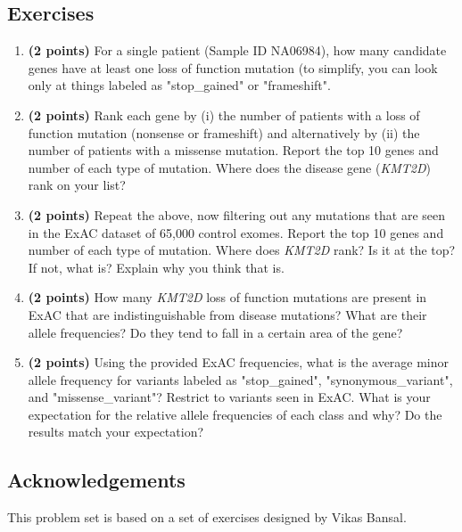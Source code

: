 \documentclass[12pt]{article}
\begin{document}
\subsection*{Exercises}

\begin{enumerate}

\item \textbf{(2 points)} For a single patient (Sample ID NA06984), how many candidate genes have at least one loss of function mutation (to simplify, you can look only at things labeled as "stop\_gained" or "frameshift".

\item \textbf{(2 points)} Rank each gene by (i) the number of patients with a loss of function mutation (nonsense or frameshift) and alternatively by (ii) the number of patients with a missense mutation. Report the top 10 genes and number of each type of mutation. Where does the disease gene (\emph{KMT2D}) rank on your list?

\item \textbf{(2 points)} Repeat the above, now filtering out any mutations that are seen in the ExAC dataset of 65,000 control exomes. Report the top 10 genes and number of each type of mutation. Where does \emph{KMT2D} rank? Is it at the top? If not, what is? Explain why you think that is.

\item \textbf{(2 points)} How many \emph{KMT2D} loss of function mutations are present in ExAC that are indistinguishable from disease mutations? What are their allele frequencies? Do they tend to fall in a certain area of the gene?

\item \textbf{(2 points)} Using the provided ExAC frequencies, what is the average minor allele frequency for variants labeled as "stop\_gained", "synonymous\_variant", and "missense\_variant"? Restrict to variants seen in ExAC. What is your expectation for the relative allele frequencies of each class and why? Do the results match your expectation?

\end{enumerate}

\subsection*{Acknowledgements}
This problem set is based on a set of exercises designed by Vikas Bansal.
\end{document}
